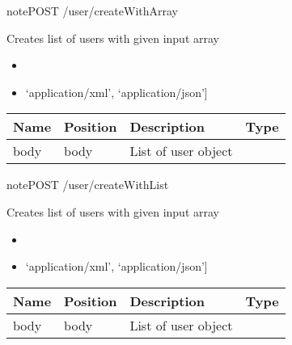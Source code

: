 \documentclass[letterpaper,10pt,english]{sphinxmanual}
\begin{document}
\begin{sphinxadmonition}{note}{POST /user/createWithArray}

Creates list of users with given input array\begin{itemize}
\item {} 

\item {} 
\sphinxstylestrong{Produces: 
}{[}‘application/xml’, ‘application/json’{]}

\end{itemize}




\begin{savenotes}\sphinxattablestart
\centering
\begin{tabulary}{\linewidth}[t]{|T|T|T|T|}
\hline
\sphinxstyletheadfamily 
Name
&\sphinxstyletheadfamily 
Position
&\sphinxstyletheadfamily 
Description
&\sphinxstyletheadfamily 
Type
\\
\hline
body
&
body
&
List of user object
&

\\
\hline
\end{tabulary}
\par
\sphinxattableend\end{savenotes}


\end{sphinxadmonition}

\begin{sphinxadmonition}{note}{POST /user/createWithList}

Creates list of users with given input array\begin{itemize}
\item {} 

\item {} 
\sphinxstylestrong{Produces: 
}{[}‘application/xml’, ‘application/json’{]}

\end{itemize}




\begin{savenotes}\sphinxattablestart
\centering
\begin{tabulary}{\linewidth}[t]{|T|T|T|T|}
\hline
\sphinxstyletheadfamily 
Name
&\sphinxstyletheadfamily 
Position
&\sphinxstyletheadfamily 
Description
&\sphinxstyletheadfamily 
Type
\\
\hline
body
&
body
&
List of user object
&

\\
\hline
\end{tabulary}
\par
\sphinxattableend\end{savenotes}


\end{sphinxadmonition}
\end{document}
